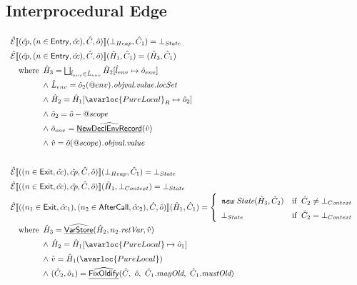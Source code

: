\subsection{Interprocedural Edge}
\[
\renewcommand\arraystretch{1.5}
\begin{array}{l}
\aE \lbr ( \acp, (n \in \SF{Entry},\hat{cc}), \hat{C}, \hat{o} ) \rbr (\bot_{Heap},\hat{C}_1) 
    = \bot_{State}\\

\aE \lbr ( \acp, (n \in \SF{Entry},\hat{cc}), \hat{C},\hat{o} ) \rbr (\hat{H}_1,\hat{C}_1) 
    = (\hat{H}_3,\hat{C}_1) \\
  \quad\wherec{
    \hat{H}_3 = \bigsqcup_{\hat{l}_{env}\in \hat{L}_{env}} \hat{H}_2[\hat{l}_{env} \mapsto \hat{o}_{env}]\\
    \land\ \hat{L}_{env} = \hat{o}_2(\varprop{env})\emph{.objval.value.locSet}\\
    \land\ \hat{H}_2 = \hat{H}_1[\avarloc{PureLocal}_R \mapsto \hat{o}_2] \\
    \land\ \hat{o}_2 = \hat{o} - \varprop{scope} \\
    \land\ \hat{o}_{env} = \ahf{NewDeclEnvRecord}(\hat{v}) \\
    \land\ \hat{v} = \hat{o}(\varprop{scope})\emph{.objval.value}
  }
\\\\

\aE \lbr ( (n \in \SF{Exit}, \hat{cc}), \acp, \hat{C},\hat{o} ) \rbr (\bot_{Heap}, \hat{C}_1)
    = \bot_{State}\\

\aE \lbr ( (n \in \SF{Exit}, \hat{cc}), \acp, \hat{C},\hat{o} ) \rbr (\hat{H}_1, \bot_{Context})
    = \bot_{State}\\

\aE \lbr ( (n_1 \in \SF{Exit}, \hat{cc}_1), (n_2 \in \SF{AfterCall}, \hat{cc}_2), \hat{C}, \hat{o} ) \rbr (\hat{H}_1, \hat{C}_1)
   = \left\{
   \begin{array}{ll}
   \emph{\TT{new}\ State}(\hat{H}_3, \hat{C}_2) & \ifc{\hat{C}_2 \neq \bot_{Context}}\\
   \bot_{State} & \ifc{\hat{C}_2 = \bot_{Context}}\\
   \end{array}
   \right. \\
\quad\wherec{
    \hat{H}_3 = \ahf{VarStore}(\hat{H}_2, n_2\emph{.retVar}, \hat{v})\\
	\land\ \hat{H}_2 = \hat{H}_1[\avarloc{PureLocal} \mapsto \hat{o}_1]\\
	\land\ \hat{v} = \hat{H}_1(\avarloc{PureLocal})\\
	\land\ (\hat{C}_2, \hat{o}_1) = \ahf{FixOldify}(\hat{C},\ \hat{o},\ \hat{C}_1\emph{.mayOld},\ \hat{C}_1\emph{.mustOld})
}\\\\


\end{array}\]
